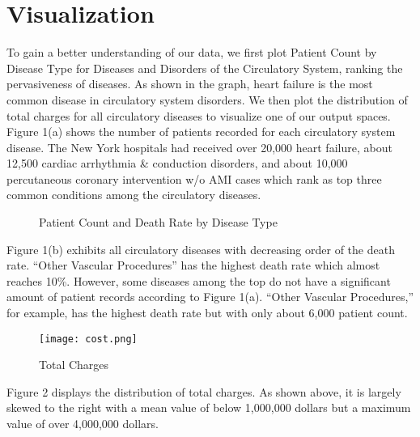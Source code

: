 \documentclass[12pt]{article}
\begin{document}
\section{Visualization}

To gain a better understanding of our data, we first plot Patient Count by Disease Type for Diseases and Disorders of the Circulatory System, ranking the pervasiveness of diseases. As shown in the graph, heart failure is the most common disease in circulatory system disorders. We then plot the distribution of total charges for all circulatory diseases to visualize one of our output spaces. \bigskip
\newline Figure 1(a) shows the number of patients recorded for each circulatory system disease. The New York hospitals had received over 20,000 heart failure, about 12,500 cardiac arrhythmia \& conduction disorders, and about 10,000 percutaneous coronary intervention w/o AMI cases which rank as top three common conditions among the circulatory diseases. 

\begin{figure}[H]
 
  \hfill
  \caption{Patient Count and Death Rate by Disease Type}
\end{figure}

\noindent Figure 1(b) exhibits all circulatory diseases with decreasing order of the death rate. “Other Vascular Procedures” has the highest death rate which almost reaches 10\%. However, some diseases among the top do not have a significant amount of patient records according to Figure 1(a). “Other Vascular Procedures,” for example, has the highest death rate but with only about 6,000 patient count.

\begin{figure}[H]
\texttt{[image: cost.png]}
\caption{Total Charges}
\end{figure}

\noindent Figure 2 displays the distribution of total charges. As shown above, it is largely skewed to the right with a mean value of below 1,000,000 dollars but a maximum value of over 4,000,000 dollars. 
\end{document}
